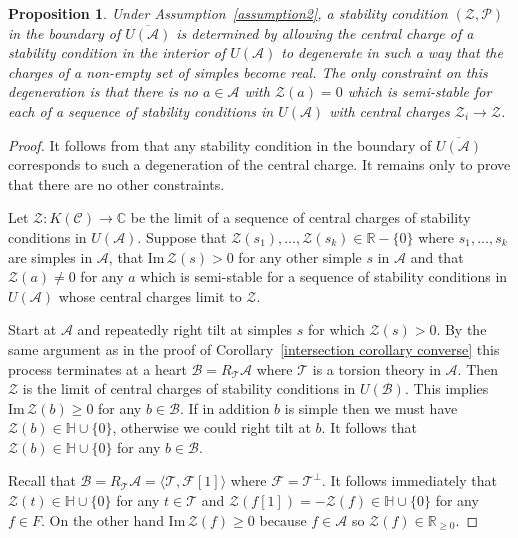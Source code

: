 \documentclass{article}
\theoremstyle{plain}
\newtheorem{proposition}[theorem]{Proposition}
\theoremstyle{definition}
\theoremstyle{remark}
\newcommand{\R}{\mathbb{R}}
\newcommand{\C}{\mathbb{C}}
\newcommand{\U}{\mathbb{H}}
\newcommand{\cat}[1]{\mathcal{#1}}
\begin{document}
\begin{proposition}
\label{constraints}
Under Assumption~\ref{assumption2}, a stability condition $(\mathcal{Z},\mathcal{P})$ in the boundary of $\overline{U(\cat{A})}$ is determined by allowing the central charge of a stability condition in the interior of $U(\cat{A})$ to degenerate in such a way that the charges of a non-empty set of simples become real. The only constraint on this degeneration is that there is no $a\in \cat{A}$ with $\mathcal{Z}(a)=0$ which is semi-stable for each of a sequence of stability conditions in $U(\cat{A})$ with central charges $\mathcal{Z}_i\to \mathcal{Z}$. \end{proposition}
\begin{proof}
It follows from \cite[Lemma 5.2]{Bridgeland:fk} that any stability condition in the boundary of $\overline{U(\cat{A})}$ corresponds to such a degeneration of the central charge. It remains only to prove that there are no other constraints.

Let $\mathcal{Z}: K(\cat{C}) \to \C$ be the limit of a sequence of central charges of stability conditions in $U(\cat{A})$. Suppose that $\mathcal{Z}(s_1), \ldots, \mathcal{Z}(s_k) \in \R-\{0\}$ where $s_1,\ldots,s_k$ are simples in $\cat{A}$, that $\mathrm{Im}\, \mathcal{Z}(s) >0$ for any other simple $s$ in $\cat{A}$ and that $\mathcal{Z}(a) \neq 0$ for any $a$ which is semi-stable for a sequence of stability conditions in $U(\cat{A})$ whose central charges limit to $\mathcal{Z}$. 

Start at $\cat{A}$ and repeatedly right tilt at simples $s$ for which $\mathcal{\mathcal{Z}}(s)>0$. By the same argument as in the proof of Corollary~\ref{intersection corollary converse} this process terminates at a heart $\cat{B} = R_\cat{T}\cat{A}$ where 
$\cat{T}$ is a torsion theory in $\cat{A}$. Then $\mathcal{Z}$ is the limit of central charges of stability conditions in $U(\cat{B})$.  This implies $\mathrm{Im}\, \mathcal{Z}(b) \geq 0$ for any $b\in \cat{B}$. If in addition $b$ is simple then we must have $\mathcal{Z}(b) \in \U \cup\{0\}$, otherwise we could right tilt at $b$. It follows that $\mathcal{Z}(b) \in \U \cup\{0\}$ for any $b\in \cat{B}$.

Recall that $\cat{B} = R_\cat{T}\cat{A} = \langle \cat{T}, \cat{F}[1] \rangle$ where $\cat{F} = \cat{T}^\perp$. It follows immediately that $\mathcal{Z}(t) \in \U \cup\{0\}$ for any $t\in \cat{T}$ and $\mathcal{Z}(f[1])=-\mathcal{Z}(f) \in \U \cup \{0\}$ for any $f\in F$. On the other hand $\mathrm{Im}\, \mathcal{Z}(f) \geq 0$ because $f\in \cat{A}$ so $\mathcal{Z}(f) \in \R_{\geq 0}$. 


\end{proof}
\end{document}
